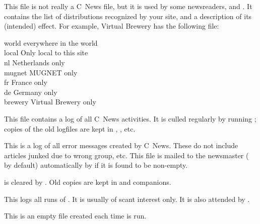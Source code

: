 \documentclass[11pt,makeidx]{report}
\begin{document}
{\begin{dispitems}
        This file is not really a C~News file, but it is used by some
        newsreaders, and . It contains the list of
        distributions recognized by your site, and a description of its
        (intended) effect. For example, Virtual Brewery has the
        following file:

        \begin{tscreen}
         
	 world\hspace{11ex}    everywhere in the world\\ 
	 local\hspace{11ex}    Only local to this site\\ 
	 nl\hspace{15ex}       Netherlands only\\ 
	 mugnet\hspace{10ex}   MUGNET only\\ 
	 fr\hspace{15ex}       France only\\ 
	 de\hspace{15ex}       Germany only\\ 
	 brewery\hspace{9ex}   Virtual Brewery only
        \end{tscreen}


        This file contains a log of all C~News activities. It is culled
        regularly by running ; copies of the old logfiles
        are kept in , , etc.

        This is a log of all error messages created by C~News. These do
        not include articles junked due to wrong group, etc. This file
        is mailed to the newsmaster ( by default)
        automatically by  if it is found to be
        non-empty.

         is cleared by . Old copies are kept
        in  and companions.

        This logs all runs of . It is usually of scant
        interest only. It is also attended by .

        This is an empty file created each time  is run.

\end{dispitems}
}
\end{document}

